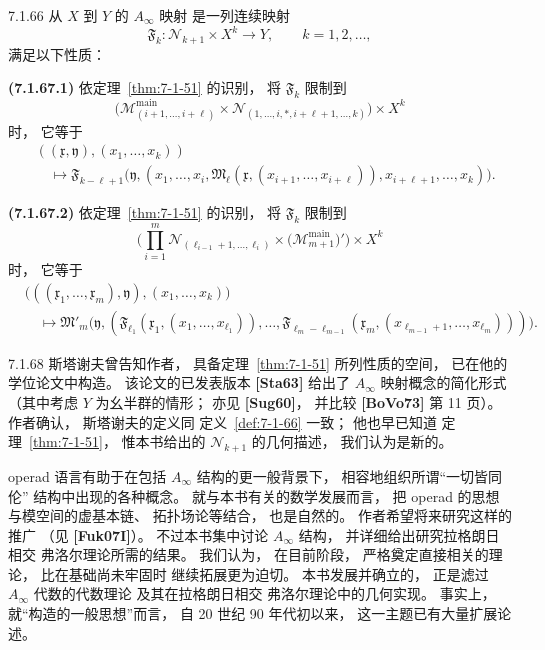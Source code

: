 \begin{definition}{7.1.66}\label{def:7-1-66}
从 $X$ 到 $Y$ 的
$A_\infty$ 映射
是一列连续映射
\[
\mathfrak F_k\colon
\mathcal N_{k+1}\times X^k
\longrightarrow Y,
\qquad k=1,2,\ldots,
\]
满足以下性质：

\noindent\textbf{(7.1.67.1)}
依定理~\ref{thm:7-1-51}
的识别，
将 $\mathfrak F_k$ 限制到
\[
\bigl(
\mathcal M^{\mathrm{main}}_{(i+1,\ldots,i+\ell)}
\times
\mathcal N_{(1,\ldots,i,*,i+\ell+1,\ldots,k)}
\bigr)\times X^k
\]
时，
它等于
\[
\begin{aligned}
&((\mathfrak x,\mathfrak y),
(x_1,\ldots,x_k))\\
&\quad\longmapsto
\mathfrak F_{k-\ell+1}
\bigl(
\mathfrak y,
(x_1,\ldots,x_i,
\mathfrak M_\ell(
\mathfrak x,(x_{i+1},\ldots,x_{i+\ell})),
x_{i+\ell+1},\ldots,x_k)
\bigr).
\end{aligned}
\]

\noindent\textbf{(7.1.67.2)}
依定理~\ref{thm:7-1-51}
的识别，
将 $\mathfrak F_k$ 限制到
\[
\biggl(
\prod_{i=1}^{m}
\mathcal N_{(\ell_{i-1}+1,\ldots,\ell_i)}
\times
\bigl(\mathcal M^{\mathrm{main}}_{m+1}\bigr)'
\biggr)\times X^k
\]
时，
它等于
\[
\begin{aligned}
&\bigl(
((\mathfrak x_1,\ldots,\mathfrak x_m),
\mathfrak y),
(x_1,\ldots,x_k)
\bigr)\\
&\quad\longmapsto
\mathfrak M'_m
\bigl(
\mathfrak y,
(\mathfrak F_{\ell_1}
(\mathfrak x_1,(x_1,\ldots,x_{\ell_1})),
\ldots,
\mathfrak F_{\ell_m-\ell_{m-1}}
(\mathfrak x_m,
(x_{\ell_{m-1}+1},\ldots,x_{\ell_m})))
\bigr).
\end{aligned}
\]
\end{definition}

\begin{remark}{7.1.68}\label{rem:7-1-68}
斯塔谢夫曾告知作者，
具备定理~\ref{thm:7-1-51}
所列性质的空间，
已在他的学位论文中构造。
该论文的已发表版本 \textbf{[Sta63]}
给出了 $A_\infty$ 映射概念的简化形式
（其中考虑 $Y$ 为幺半群的情形；
亦见 \textbf{[Sug60]}，
并比较 \textbf{[BoVo73]} 第 11 页）。
作者确认，
斯塔谢夫的定义同
定义~\ref{def:7-1-66} 一致；
他也早已知道
定理~\ref{thm:7-1-51}，
惟本书给出的
$\mathcal N_{k+1}$
的几何描述，
我们认为是新的。

operad 语言有助于在包括
$A_\infty$ 结构的更一般背景下，
相容地组织所谓“一切皆同伦”
结构中出现的各种概念。
就与本书有关的数学发展而言，
把 operad 的思想
与模空间的虚基本链、
拓扑场论等结合，
也是自然的。
作者希望将来研究这样的推广
（见 \textbf{[Fuk07I]}）。
不过本书集中讨论
$A_\infty$ 结构，
并详细给出研究拉格朗日相交
弗洛尔理论所需的结果。
我们认为，
在目前阶段，
严格奠定直接相关的理论，
比在基础尚未牢固时
继续拓展更为迫切。
本书发展并确立的，
正是滤过 $A_\infty$ 代数的代数理论
及其在拉格朗日相交
弗洛尔理论中的几何实现。
事实上，
就“构造的一般思想”而言，
自 20 世纪 90 年代初以来，
这一主题已有大量扩展论述。
\end{remark}

